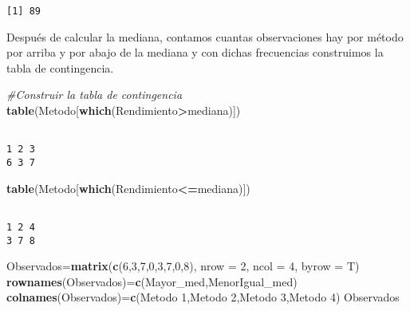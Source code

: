 \documentclass[
  a4paper,
  oneside,
  openany]{book}
\newenvironment{Shaded}{\begin{snugshade}}{\end{snugshade}}
\newcommand{\AttributeTok}[1]{\textcolor[rgb]{0.13,0.29,0.53}{#1}}
\newcommand{\CommentTok}[1]{\textcolor[rgb]{0.56,0.35,0.01}{\textit{#1}}}
\newcommand{\DecValTok}[1]{\textcolor[rgb]{0.00,0.00,0.81}{#1}}
\newcommand{\FunctionTok}[1]{\textcolor[rgb]{0.13,0.29,0.53}{\textbf{#1}}}
\newcommand{\NormalTok}[1]{#1}
\newcommand{\OtherTok}[1]{\textcolor[rgb]{0.56,0.35,0.01}{#1}}
\newcommand{\SpecialCharTok}[1]{\textcolor[rgb]{0.81,0.36,0.00}{\textbf{#1}}}
\newcommand{\StringTok}[1]{\textcolor[rgb]{0.31,0.60,0.02}{#1}}
\begin{document}
\begin{verbatim}
[1] 89
\end{verbatim}

Después de calcular la mediana, contamos cuantas observaciones hay por método por arriba y por abajo de la mediana y con dichas frecuencias construimos la tabla de contingencia.

\begin{Shaded}
\begin{Highlighting}[]
\CommentTok{\#Construir la tabla de contingencia}
\FunctionTok{table}\NormalTok{(Metodo[}\FunctionTok{which}\NormalTok{(Rendimiento}\SpecialCharTok{\textgreater{}}\NormalTok{mediana)])}
\end{Highlighting}
\end{Shaded}

\begin{verbatim}

1 2 3 
6 3 7 
\end{verbatim}

\begin{Shaded}
\begin{Highlighting}[]
\FunctionTok{table}\NormalTok{(Metodo[}\FunctionTok{which}\NormalTok{(Rendimiento}\SpecialCharTok{\textless{}=}\NormalTok{mediana)])}
\end{Highlighting}
\end{Shaded}

\begin{verbatim}

1 2 4 
3 7 8 
\end{verbatim}

\begin{Shaded}
\begin{Highlighting}[]
\NormalTok{Observados}\OtherTok{=}\FunctionTok{matrix}\NormalTok{(}\FunctionTok{c}\NormalTok{(}\DecValTok{6}\NormalTok{,}\DecValTok{3}\NormalTok{,}\DecValTok{7}\NormalTok{,}\DecValTok{0}\NormalTok{,}\DecValTok{3}\NormalTok{,}\DecValTok{7}\NormalTok{,}\DecValTok{0}\NormalTok{,}\DecValTok{8}\NormalTok{), }\AttributeTok{nrow =} \DecValTok{2}\NormalTok{, }\AttributeTok{ncol =} \DecValTok{4}\NormalTok{, }\AttributeTok{byrow =}\NormalTok{ T)}
\FunctionTok{rownames}\NormalTok{(Observados)}\OtherTok{=}\FunctionTok{c}\NormalTok{(}\StringTok{\textquotesingle{}Mayor\_med\textquotesingle{}}\NormalTok{,}\StringTok{\textquotesingle{}MenorIgual\_med\textquotesingle{}}\NormalTok{)}
\FunctionTok{colnames}\NormalTok{(Observados)}\OtherTok{=}\FunctionTok{c}\NormalTok{(}\StringTok{\textquotesingle{}Metodo 1\textquotesingle{}}\NormalTok{,}\StringTok{\textquotesingle{}Metodo 2\textquotesingle{}}\NormalTok{,}\StringTok{\textquotesingle{}Metodo 3\textquotesingle{}}\NormalTok{,}\StringTok{\textquotesingle{}Metodo 4\textquotesingle{}}\NormalTok{)}
\NormalTok{Observados}
\end{Highlighting}
\end{Shaded}
\end{document}
